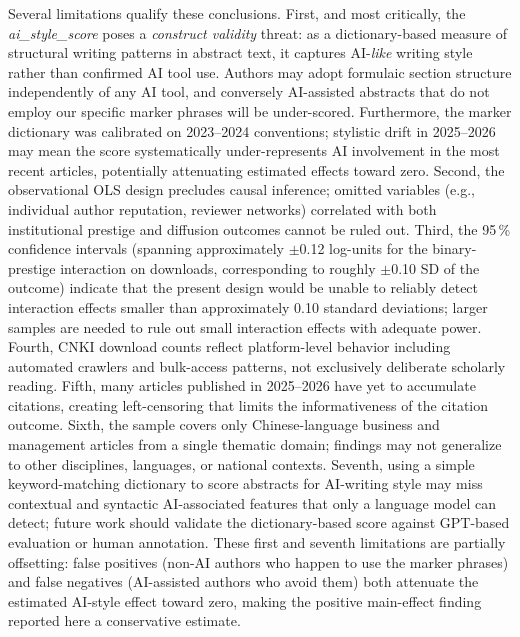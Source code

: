 \documentclass[12pt,a4paper]{article}
\begin{document}
Several limitations qualify these conclusions.
First, and most critically, the \textit{ai\_style\_score} poses a
\textit{construct validity} threat: as a dictionary-based measure
of structural writing patterns in abstract text,
it captures AI-\textit{like} writing style rather than confirmed
AI tool use.
Authors may adopt formulaic section structure independently of any AI
tool, and conversely AI-assisted abstracts that do not employ
our specific marker phrases will be under-scored.
Furthermore, the marker dictionary was calibrated on 2023--2024
conventions; stylistic drift in 2025--2026 may mean the score
systematically under-represents AI involvement in the most recent
articles, potentially attenuating estimated effects toward zero.
Second, the observational OLS design precludes causal inference;
omitted variables (e.g., individual author reputation, reviewer networks)
correlated with both institutional prestige and diffusion outcomes
cannot be ruled out.
Third, the 95\,\% confidence intervals (spanning approximately
$\pm$0.12 log-units for the binary-prestige interaction on downloads,
corresponding to roughly $\pm$0.10 SD of the outcome)
indicate that the present design would be unable to reliably detect
interaction effects smaller than approximately 0.10 standard deviations;
larger samples are needed to rule out small interaction effects with
adequate power.
Fourth, CNKI download counts reflect platform-level behavior including
automated crawlers and bulk-access patterns, not exclusively deliberate
scholarly reading.
Fifth, many articles published in 2025--2026 have yet to accumulate
citations, creating left-censoring that limits the informativeness of
the citation outcome.
Sixth, the sample covers only Chinese-language business and management
articles from a single thematic domain; findings may not generalize
to other disciplines, languages, or national contexts.
Seventh, using a simple keyword-matching dictionary to score abstracts
for AI-writing style may miss contextual and syntactic AI-associated
features that only a language model can detect; future work should
validate the dictionary-based score against GPT-based evaluation or
human annotation.
These first and seventh limitations are partially offsetting: false
positives (non-AI authors who happen to use the marker phrases) and
false negatives (AI-assisted authors who avoid them) both attenuate
the estimated AI-style effect toward zero, making the positive
main-effect finding reported here a conservative estimate.

\end{document}
